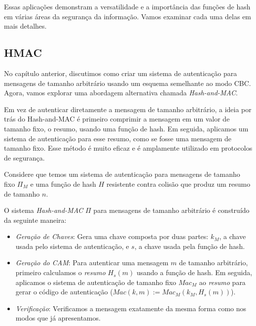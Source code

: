 Essas aplicações demonstram a versatilidade e a importância das funções de hash em várias áreas da segurança da informação.
Vamos examinar cada uma delas em mais detalhes.

\subsection{HMAC}
\label{sec:hmac}

No capítulo anterior, discutimos como criar um sistema de autenticação para mensagens de tamanho arbitrário usando um esquema semelhante ao modo CBC.
Agora, vamos explorar uma abordagem alternativa chamada {\em Hash-and-MAC}.

Em vez de autenticar diretamente a mensagem de tamanho arbitrário, a ideia por trás do Hash-and-MAC é primeiro comprimir a mensagem em um valor de tamanho fixo, o resumo, usando uma função de hash.
Em seguida, aplicamos um sistema de autenticação para esse resumo, como se fosse uma mensagem de tamanho fixo.
Esse método é muito eficaz e é amplamente utilizado em protocolos de segurança.

Considere que temos um sistema de autenticação para mensagens de tamanho fixo $\Pi_M$ e uma função de hash $H$ resistente contra colisão que produz um resumo de tamanho $n$.

O sistema \textit{Hash-and-MAC} $\Pi$ para mensagens de tamanho arbitrário é construído da seguinte maneira:

\begin{itemize}
\item[] {\em Geração de Chaves}:
  Gera uma chave composta por duas partes: $k_M$, a chave usada pelo sistema de autenticação, e $s$, a chave usada pela função de hash. 
  
\item[] {\em Geração do CAM}:
  Para autenticar uma mensagem $m$ de tamanho arbitrário, primeiro calculamos o \textit{resumo} $H_s(m)$ usando a função de hash.
  Em seguida, aplicamos o sistema de autenticação de tamanho fixo $Mac_M$ ao \textit{resumo} para gerar o código de autenticação ($Mac(k, m) := Mac_M(k_M, H_s(m))$).
  
\item[] {\em Verificação}:
  Verificamos a mensagem exatamente da mesma forma como nos modos que já apresentamos.
\end{itemize}


